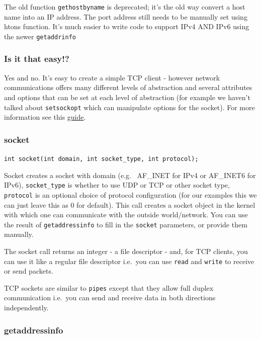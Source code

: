 \documentclass[]{article}
\begin{document}
The old function \texttt{gethostbyname} is deprecated; it's the old way
convert a host name into an IP address. The port address still needs to
be manually set using htons function. It's much easier to write code to
support IPv4 AND IPv6 using the newer \texttt{getaddrinfo}

\subsubsection{Is it that easy!?}\label{is-it-that-easy}

Yes and no. It's easy to create a simple TCP client - however network
communications offers many different levels of abstraction and several
attributes and options that can be set at each level of abstraction (for
example we haven't talked about \texttt{setsockopt} which can manipulate
options for the socket). For more information see this
\href{http://www.beej.us/guide/bgnet/output/html/multipage/getaddrinfoman.html}{guide}.

\subsubsection{socket}\label{socket}

\texttt{int\ socket(int\ domain,\ int\ socket\_type,\ int\ protocol);}

Socket creates a socket with domain (e.g. ~AF\_INET for IPv4 or
AF\_INET6 for IPv6), \texttt{socket\_type} is whether to use UDP or TCP
or other socket type, \texttt{protocol} is an optional choice of
protocol configuration (for our examples this we can just leave this as
0 for default). This call creates a socket object in the kernel with
which one can communicate with the outside world/network. You can use
the result of \texttt{getaddressinfo} to fill in the \texttt{socket}
parameters, or provide them manually.

The socket call returns an integer - a file descriptor - and, for TCP
clients, you can use it like a regular file descriptor i.e.~you can use
\texttt{read} and \texttt{write} to receive or send packets.

TCP sockets are similar to \texttt{pipes} except that they allow full
duplex communication i.e.~you can send and receive data in both
directions independently.

\subsubsection{getaddressinfo}\label{getaddressinfo}
\end{document}
